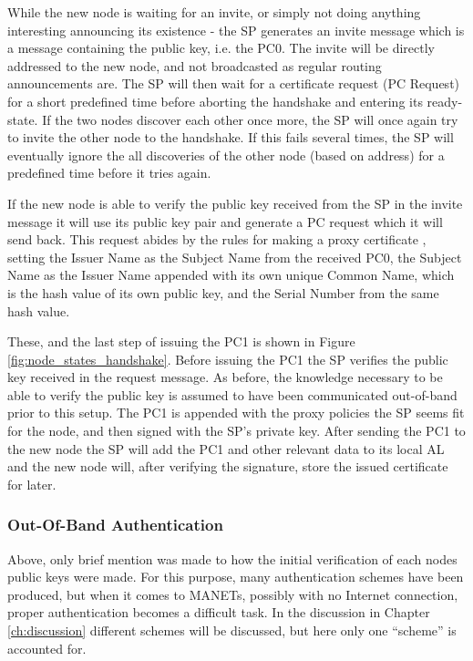 While the new node is waiting for an invite, or simply not doing anything
interesting announcing its existence - the \ac{SP} generates an invite message
which is a message containing the public key, i.e. the \ac{PC0}. The invite
will be directly addressed to the new node, and not broadcasted as regular
routing announcements are. The \ac{SP} will then wait for a certificate request
(\ac{PC} Request) for a short predefined time before aborting the handshake and
entering its ready-state. If the two nodes discover each other once more, the
\ac{SP} will once again try to invite the other node to the handshake. If this
fails several times, the \ac{SP} will eventually ignore the all discoveries of
the other node (based on address) for a predefined time before it tries again.

If the new node is able to verify the public key received from the \ac{SP} in
the invite message it will use its public key pair and generate a \ac{PC}
request which it will send back. This request abides by the rules for making a
proxy certificate \cite{rfc3820}, setting the Issuer Name as the Subject Name
from the received \ac{PC0}, the Subject Name as the Issuer Name appended with
its own unique Common Name, which is the hash value of its own public key, and
the Serial Number from the same hash value.

These, and the last step of issuing the \ac{PC1} is shown in Figure
\ref{fig:node_states_handshake}. Before issuing the \ac{PC1} the \ac{SP}
verifies the public key received in the request message. As before, the
knowledge necessary to be able to verify the public key is assumed to have been
communicated out-of-band prior to this setup. The \ac{PC1} is appended with the
proxy policies the \ac{SP} seems fit for the node, and then signed with the
\ac{SP}'s private key. After sending the \ac{PC1} to the new node the \ac{SP}
will add the \ac{PC1} and other relevant data to its local \ac{AL} and the new
node will, after verifying the signature, store the issued certificate for
later.

\subsubsection*{Out-Of-Band Authentication}
Above, only brief mention was made to how the initial verification of each nodes
public keys were made. For this purpose, many authentication schemes have been
produced, but when it comes to \acp{MANET}, possibly with no Internet
connection, proper authentication becomes a difficult task. In the discussion
in Chapter \ref{ch:discussion} different schemes will be discussed, but here
only one ``scheme'' is accounted for.

